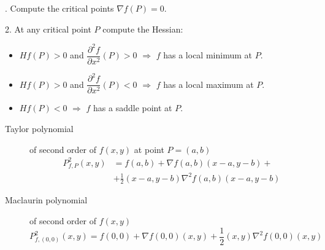 \begin{multicols}{2}
	\begin{tcolorbox}[hbox, title=Extrema and saddle points]
		\begin{minipage}{0.4\textwidth}
			. Compute the critical points $\nabla f(P)=0$.

			2. At any critical point $P$ compute the Hessian:
				\begin{itemize}
					\item $Hf(P)>0$ and $\dfrac{\partial^2 f}{\partial x^2}(P)>0$ $\Rightarrow$ $f$ has a local minimum at $P$.
					\item $Hf(P)>0$ and $\dfrac{\partial^2 f}{\partial x^2}(P)<0$ $\Rightarrow$ $f$ has a local maximum at $P$.					
					\item $Hf(P)<0$ $\Rightarrow$ $f$ has a saddle point at $P$.
					\end{itemize}
		\end{minipage}
	\end{tcolorbox}

	\begin{tcolorbox}[hbox, title=Function approximation]
		\begin{minipage}{0.4\textwidth}
			\flushleft
			\begin{description}
				\item[Taylor polynomial] of second order of $f(x,y)$ at point $P=(a,b)$
				\[
					\begin{split}					
					P^2_{f,P}(x,y)&=f(a,b)+\nabla f(a,b)(x-a,y-b)+\\
					&+\frac{1}{2}(x-a,y-b)\nabla^2f(a,b)(x-a,y-b)
					\end{split}
				\]
				\item[Maclaurin polynomial] of second order of $f(x,y)$
				\[
					P^2_{f,(0,0)}(x,y)=f(0,0)+\nabla f(0,0)(x,y)+\frac{1}{2}(x,y)\nabla^2f(0,0)(x,y)
				\]
			\end{description}
		\end{minipage}
	\end{tcolorbox}

\end{multicols}

